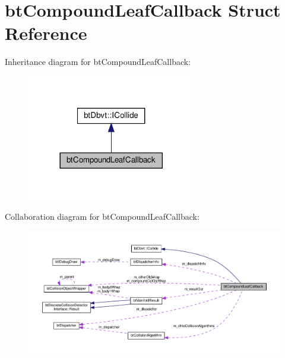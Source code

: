 \hypertarget{structbtCompoundLeafCallback}{}\section{bt\+Compound\+Leaf\+Callback Struct Reference}
\label{structbtCompoundLeafCallback}


Inheritance diagram for bt\+Compound\+Leaf\+Callback\+:
\nopagebreak
\begin{figure}[H]
\begin{center}
\leavevmode
\includegraphics[width=209pt]{structbtCompoundLeafCallback__inherit__graph}
\end{center}
\end{figure}


Collaboration diagram for bt\+Compound\+Leaf\+Callback\+:
\nopagebreak
\begin{figure}[H]
\begin{center}
\leavevmode
\includegraphics[width=350pt]{structbtCompoundLeafCallback__coll__graph}
\end{center}
\end{figure}
